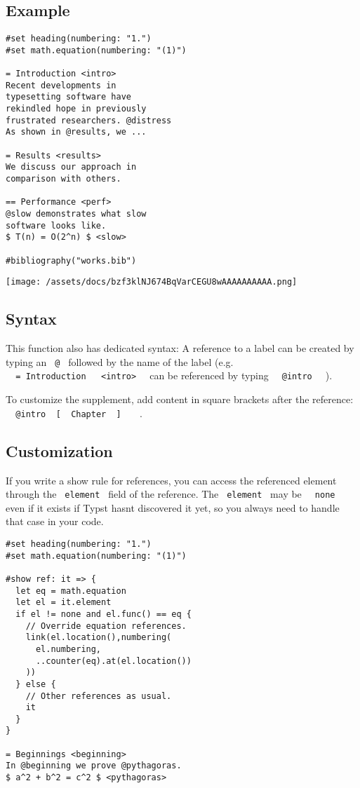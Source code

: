 \subsection{Example}\label{example}

\begin{verbatim}
#set heading(numbering: "1.")
#set math.equation(numbering: "(1)")

= Introduction <intro>
Recent developments in
typesetting software have
rekindled hope in previously
frustrated researchers. @distress
As shown in @results, we ...

= Results <results>
We discuss our approach in
comparison with others.

== Performance <perf>
@slow demonstrates what slow
software looks like.
$ T(n) = O(2^n) $ <slow>

#bibliography("works.bib")
\end{verbatim}

\texttt{[image: /assets/docs/bzf3klNJ674BqVarCEGU8wAAAAAAAAAA.png]}

\subsection{Syntax}\label{syntax}

This function also has dedicated syntax: A reference to a label can be
created by typing an \texttt{\ @\ } followed by the name of the label
(e.g.
\texttt{\ }{\texttt{\ =\ Introduction\ }}\texttt{\ }{\texttt{\ \textless{}intro\textgreater{}\ }}\texttt{\ }
can be referenced by typing \texttt{\ }{\texttt{\ @intro\ }}\texttt{\ }
).

To customize the supplement, add content in square brackets after the
reference:
\texttt{\ }{\texttt{\ @intro\ }{\texttt{\ {[}\ }}\texttt{\ Chapter\ }{\texttt{\ {]}\ }}\texttt{\ }}\texttt{\ }
.

\subsection{Customization}\label{customization}

If you write a show rule for references, you can access the referenced
element through the \texttt{\ element\ } field of the reference. The
\texttt{\ element\ } may be \texttt{\ }{\texttt{\ none\ }}\texttt{\ }
even if it exists if Typst hasn\textquotesingle t discovered it yet, so
you always need to handle that case in your code.

\begin{verbatim}
#set heading(numbering: "1.")
#set math.equation(numbering: "(1)")

#show ref: it => {
  let eq = math.equation
  let el = it.element
  if el != none and el.func() == eq {
    // Override equation references.
    link(el.location(),numbering(
      el.numbering,
      ..counter(eq).at(el.location())
    ))
  } else {
    // Other references as usual.
    it
  }
}

= Beginnings <beginning>
In @beginning we prove @pythagoras.
$ a^2 + b^2 = c^2 $ <pythagoras>
\end{verbatim}

